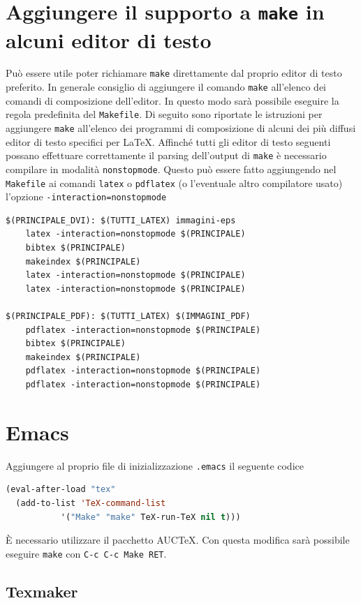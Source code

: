 \section{Aggiungere il supporto a \texttt{make} in alcuni editor di testo}
\label{sec:editor}

Può essere utile poter richiamare \texttt{make} direttamente dal proprio editor
di testo preferito.  In generale consiglio di aggiungere il comando
\texttt{make} all'elenco dei comandi di composizione dell'editor.  In questo
modo sarà possibile eseguire la regola predefinita del \texttt{Makefile}.  Di
seguito sono riportate le istruzioni per aggiungere \texttt{make} all'elenco dei
programmi di composizione di alcuni dei più diffusi editor di testo specifici
per \LaTeX{}.
Affinché tutti gli editor di testo seguenti possano effettuare correttamente il
parsing dell'output di \texttt{make} è necessario compilare in modalità
\texttt{nonstopmode}.  Questo può essere fatto aggiungendo nel \texttt{Makefile}
ai comandi \texttt{latex} o \texttt{pdflatex} (o l'eventuale altro compilatore
usato) l'opzione \texttt{-interaction=nonstopmode}
\begin{lstlisting}
$(PRINCIPALE_DVI): $(TUTTI_LATEX) immagini-eps
	latex -interaction=nonstopmode $(PRINCIPALE)
	bibtex $(PRINCIPALE)
	makeindex $(PRINCIPALE)
	latex -interaction=nonstopmode $(PRINCIPALE)
	latex -interaction=nonstopmode $(PRINCIPALE)

$(PRINCIPALE_PDF): $(TUTTI_LATEX) $(IMMAGINI_PDF)
	pdflatex -interaction=nonstopmode $(PRINCIPALE)
	bibtex $(PRINCIPALE)
	makeindex $(PRINCIPALE)
	pdflatex -interaction=nonstopmode $(PRINCIPALE)
	pdflatex -interaction=nonstopmode $(PRINCIPALE)
\end{lstlisting}

\section{Emacs}
\label{sec:emacs}

Aggiungere al proprio file di inizializzazione \texttt{.emacs} il seguente codice
\begin{lstlisting}[language=lisp,morekeywords={eval-after-load}]
(eval-after-load "tex"
  (add-to-list 'TeX-command-list
	       '("Make" "make" TeX-run-TeX nil t)))
\end{lstlisting}
È necessario utilizzare il pacchetto AUC\TeX{}.
Con questa modifica sarà possibile eseguire \texttt{make} con
\texttt{C-c C-c Make RET}.

\subsection{Texmaker}
\label{sec:texmaker}

